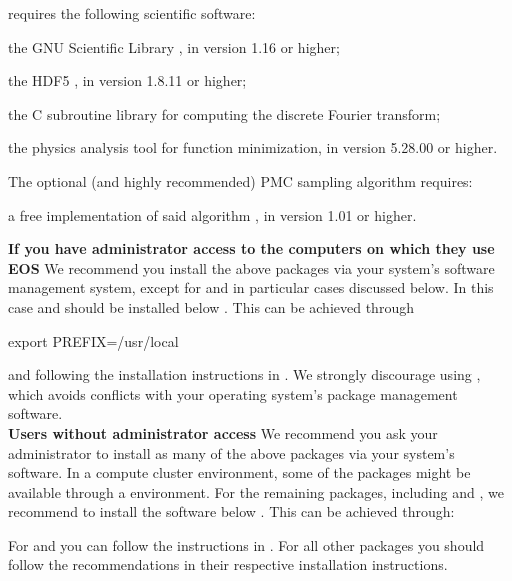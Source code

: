 \EOS requires the following scientific software:
\begin{description}[labelwidth=.15\textwidth]
    \item[\package{GSL}] the GNU Scientific Library \cite{GSL}, in version 1.16 or higher;
    \item[\package{HDF5}] the \gls{HDF5} \cite{HDF5}, in version 1.8.11 or higher;
    \item[\package{FFTW3}] the C subroutine library for computing the discrete Fourier transform;
    \item[\package{Minuit2}] the physics analysis tool for function minimization, in version 5.28.00 or higher.
\end{description}
The optional (and highly recommended) \gls{PMC} sampling algorithm requires:
\begin{description}[labelwidth=.15\textwidth]
    \item[\package{pmclib}] a free implementation of said algorithm \cite{libpmc}, in version 1.01 or higher.
\end{description}

\textbf{If you have administrator access to the computers on which they use EOS}\quad
We recommend you install the above packages via your system's software
management system, except for  and  in particular
cases discussed below. In this case  and  should
be installed below . This can be achieved through
\begin{commandline}
export PREFIX=/usr/local
\end{commandline}
and following the installation instructions in .
We strongly discourage using , which avoids conflicts with
your operating system's package management software.\\

\textbf{Users without administrator access}\quad
We recommend you ask your administrator to install as many of the above packages via your
system's software. In a compute cluster environment, some of the packages might be
available through a  environment. For the remaining packages,
including  and , we recommend to install the software
below . This can be achieved through:
For  and  you can follow the instructions in
. For all other packages you should follow the recommendations
in their respective installation instructions.


